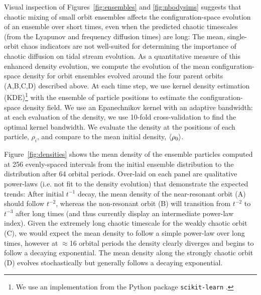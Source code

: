 Visual inspection of Figures~\ref{fig:ensembles} and \ref{fig:nbodysims} suggests that chaotic mixing of small orbit ensembles affects the configuration-space evolution of an ensemble over short times, even when the predicted chaotic timescales (from the Lyapunov and frequency diffusion times) are long: The mean, single-orbit chaos indicators are not well-suited for determining the importance of chaotic diffusion on tidal stream evolution. As a quantitative measure of this enhanced density evolution, we compute the evolution of the mean configuration-space density for orbit ensembles evolved around the four parent orbits (A,B,C,D) described above. At each time step, we use kernel density estimation (KDE)\footnote{We use an implementation from the Python package \texttt{scikit-learn} \citep{scikitlearn}.} with the ensemble of particle positions to estimate the configuration-space density field. We use an Epanechnikov kernel with an adaptive bandwidth: at each evaluation of the density, we use 10-fold cross-validation to find the optimal kernel bandwidth. We evaluate the density at the positions of each particle, $\rho_i$, and compare to the mean initial density, $\left< \rho_0 \right>$. 

Figure~\ref{fig:densities} shows the mean density of the ensemble particles computed at 256 evenly-spaced intervals from the initial ensemble distribution to the distribution after 64 orbital periods. Over-laid on each panel are qualitative power-laws (i.e. not fit to the density evolution) that demonstrate the expected trends: After initial $t^{-1}$ decay, the mean density of the near-resonant orbit (A) should follow $t^{-2}$, whereas the non-resonant orbit (B) will transition from $t^{-2}$ to $t^{-3}$ after long times (and thus currently display an intermediate power-law index). Given the extremely long chaotic timescale for the weakly chaotic orbit (C), we would expect the mean density to follow a simple power-law over long times, however at $\approx$16 orbital periods the density clearly diverges and begins to follow a decaying exponential. The mean density along the strongly chaotic orbit (D) evolves stochastically but generally follows a decaying exponential.


